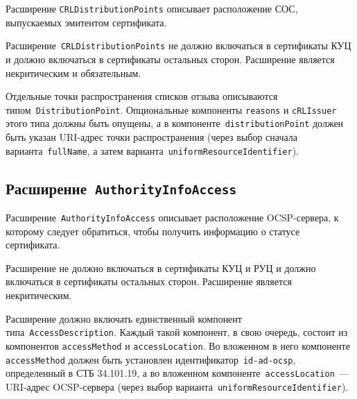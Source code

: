 Расширение \texttt{CRLDistributionPoints} описывает расположение СОС, 
выпускаемых эмитентом сертификата. 

Расширение~\texttt{CRLDistributionPoints} 
не должно включаться в сертификаты КУЦ и должно включаться в
сертификаты остальных сторон. Расширение является некритическим и обязательным.

Отдельные точки распространения списков отзыва описываются 
типом~\texttt{DistributionPoint}. Опциональные компоненты \texttt{reasons} 
и \texttt{cRLIssuer} этого типа должны быть опущены, а в 
компоненте~\texttt{distributionPoint} должен быть указан 
URI-адрес точки распространения (через выбор сначала 
варианта~\texttt{fullName}, а затем 
варианта~\texttt{uniformResourceIdentifier}). 

\subsection{Расширение~\texttt{AuthorityInfoAccess}}

Расширение~\texttt{AuthorityInfoAccess} описывает расположение 
OCSP-сервера, к которому следует обратиться, чтобы получить информацию о 
статусе сертификата.

Расширение не должно включаться в сертификаты КУЦ и РУЦ и должно 
включаться в сертификаты остальных сторон. Расширение является 
некритическим. 

Расширение должно включать единственный компонент 
типа~\texttt{AccessDescription}. Каждый такой компонент, в свою очередь, 
состоит из компонентов \texttt{accessMethod} и \texttt{accessLocation}. 
%
Во вложенном в него компоненте \texttt{accessMethod} должен быть установлен 
идентификатор~\verb|id-ad-ocsp|, определенный в СТБ 34.101.19,
%
а во вложенном компоненте~\texttt{accessLocation}~--- URI-адрес OCSP-сервера
(через выбор варианта~\texttt{uniformResourceIdentifier}).

